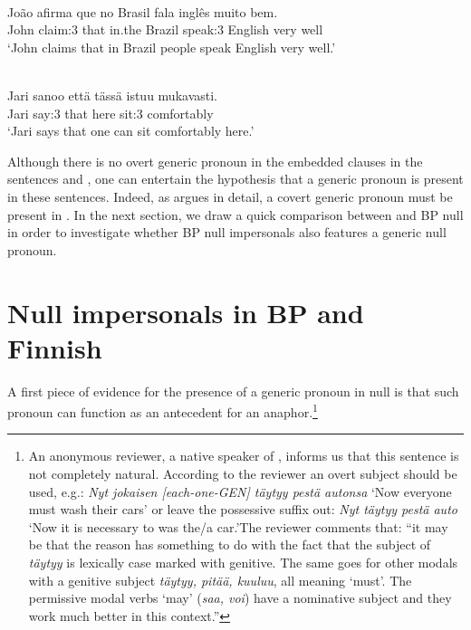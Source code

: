\documentclass[output=paper]{LSP/langsci}
\begin{document}
\ea\label{ex:7.alexiadou}
\\
\gll João afirma que no Brasil fala inglês muito bem.\\
 John claim:3 that in.the Brazil speak:3 English very well\\
\glt ‘John claims that in Brazil people speak English very well.’
\z


\ea\label{ex:8.alexiadou}
\\
\gll Jari sanoo että tässä istuu mukavasti.\\
 Jari say:3 that here sit:3 comfortably\\
\glt ‘Jari says that one can sit comfortably here.’
\z


Although there is no overt generic pronoun in the embedded clauses in the sentences  and , one can entertain the hypothesis that a generic pronoun is present in these sentences. Indeed, as \citet{Holmberg2005,Holmberg2010finnish} argues in detail, a covert generic pronoun must be present in . In the next section, we draw a quick comparison between  and BP null  in order to investigate whether BP null impersonals also features a generic null pronoun.

\newpage 
\section{Null impersonals in BP and Finnish}\label{§3.alexiadou}

A first piece of evidence for the presence of a generic pronoun in  null  is that such pronoun can function as an antecedent for an anaphor.\footnote{An anonymous reviewer, a native speaker of , informs us that this sentence is not completely natural. According to the reviewer an overt subject should be used, e.g.: \textit{Nyt jokaisen [each-one-GEN] täytyy pestä autonsa} ‘Now everyone must wash their cars’ or leave the possessive suffix out: \textit{Nyt täytyy pestä auto} ‘Now it is necessary to was the/a car.’The reviewer comments that: “it may be that the reason has something to do with the fact that the subject of \textit{täytyy} is lexically case marked with genitive. The same goes for other modals with a genitive subject \textit{täytyy, pitää, kuuluu}, all meaning ‘must’. The permissive modal verbs ‘may’ (\textit{saa, voi}) have a nominative subject and they work much better in this context.”}
\end{document}

